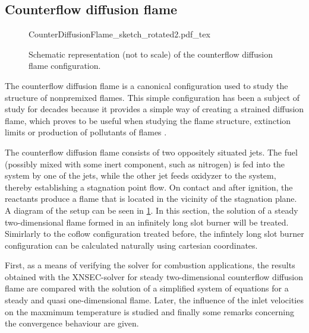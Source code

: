 
\subsection[Counterflow diffusion flame]{Counterflow diffusion flame \footnotemark}\label{ss:CDF}
\begin{figure}[h!]
	\begin{center}
		\def\svgwidth{0.8\textwidth}
		{CounterDiffusionFlame_sketch_rotated2.pdf_tex}
		\caption{Schematic representation (not to scale) of the counterflow diffusion flame configuration.}
		\label{fig:CDFScheme}
	\end{center}
\end{figure}

The counterflow diffusion flame is a canonical configuration used to study the structure of nonpremixed flames. This simple configuration has been a subject of study for decades because it provides a simple way of creating a strained diffusion flame, which proves to be useful when studying the flame structure, extinction limits or production of pollutants of flames \parencite{pandyaStructureFlatCounterFlow1964,spaldingTheoryMixingChemical1961,keyesFlameSheetStarting1987, leeTwodimensionalDirectNumerical2000}. 

The counterflow diffusion flame consists of two oppositely situated jets. The fuel (possibly mixed with some inert component, such as nitrogen) is fed into the system by one of the jets, while the other jet feeds oxidyzer to the system, thereby establishing a stagnation point flow. On contact and after ignition, the reactants produce a flame that is located in the vicinity of the stagnation plane. A diagram of the setup can be seen in \cref{fig:CDFScheme}. In this section, the solution of a steady two-dimensional flame formed in an infinitely long slot burner will be treated. Simirlarly to the coflow configuration treated before, the infintely long slot burner configuration can be calculated naturally using cartesian coordinates.

First, as a means of verifying the solver for combustion applications, the results obtained with the XNSEC-solver for steady two-dimensional counterflow diffusion flame are compared with the solution of a simplified system of equations for a steady and quasi one-dimensional flame. Later, the influence of the inlet velocities on the maxmimum temperature is studied and finally some remarks concerning the convergence behaviour are given. 
